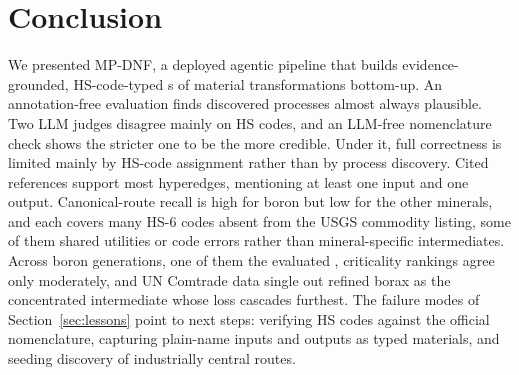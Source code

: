 \section{Conclusion}
\label{sec:conclusion}

We presented MP-DNF, a deployed agentic pipeline that builds evidence-grounded, HS-code-typed \tool{}s of material transformations bottom-up. An annotation-free evaluation finds discovered processes almost always plausible. Two LLM judges disagree mainly on HS codes, and an LLM-free nomenclature check shows the stricter one to be the more credible. Under it, full correctness is limited mainly by HS-code assignment rather than by process discovery. Cited references support most hyperedges, mentioning at least one input and one output. Canonical-route recall is high for boron but low for the other minerals, and each \tool{} covers many HS-6 codes absent from the USGS commodity listing, some of them shared utilities or code errors rather than mineral-specific intermediates. Across \RboRuns{} boron generations, one of them the evaluated \tool{}, criticality rankings agree only moderately, and UN Comtrade data single out refined borax as the concentrated intermediate whose loss cascades furthest. The failure modes of Section~\ref{sec:lessons} point to next steps: verifying HS codes against the official nomenclature, capturing plain-name inputs and outputs as typed materials, and seeding discovery of industrially central routes.
